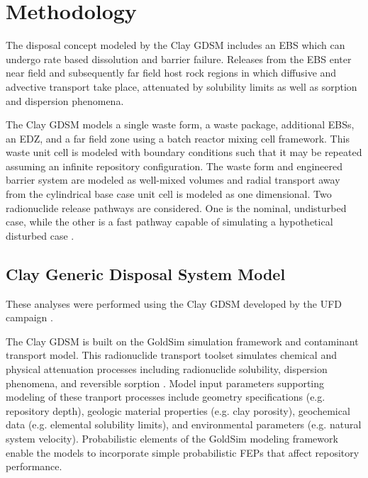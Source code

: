 \section{Methodology}

The disposal concept modeled by the Clay \gls{GDSM} includes an \gls{EBS} which 
can undergo rate based dissolution and barrier failure. Releases from the 
\gls{EBS} enter 
near field and subsequently far field host rock regions in which diffusive and 
advective transport take place, attenuated by solubility limits as well as 
sorption and dispersion phenomena.  

The Clay \gls{GDSM} models a single waste form, a waste package, additional 
\glspl{EBS}, 
an \gls{EDZ}, and a far field zone using a batch reactor mixing cell framework. 
This waste unit cell is modeled 
with boundary conditions such that it may be repeated assuming an infinite 
repository configuration. The waste form and engineered barrier system are 
modeled as well-mixed volumes 
and radial transport away from the cylindrical base case unit cell is modeled as  
one dimensional. Two radionuclide release pathways are considered. One is the 
nominal, 
undisturbed case, while the other is a fast pathway capable of simulating a 
hypothetical disturbed case 
\cite{clayton_generic_2011}.

\subsection{Clay Generic Disposal System Model}

These analyses were performed using the Clay \gls{GDSM} developed by the 
\gls{UFD} campaign \cite{clayton_generic_2011}. 

The Clay \gls{GDSM} is built on the GoldSim simulation framework and contaminant 
transport model.  This radionuclide transport toolset simulates chemical and 
physical attenuation processes including radionuclide solubility, dispersion 
phenomena, and reversible sorption \cite{golder_goldsim_2010, 
golder_goldsim_ct_2010}. Model input parameters supporting modeling of these tranport 
processes include geometry specifications (e.g. repository depth), geologic 
material properties (e.g. clay porosity), geochemical data 
(e.g. elemental solubility limits), and environmental parameters (e.g. natural 
system velocity). Probabilistic elements of the GoldSim modeling 
framework enable the models to incorporate simple probabilistic \gls{FEPs} that 
affect repository performance.

